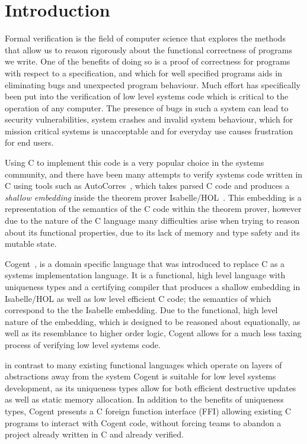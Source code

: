 \chapter{Introduction}\label{ch:intro}

Formal verification is the field of computer science that explores the methods that allow us to
  reason rigorously about the functional correctness of programs we write.
One of the benefits of doing so is a proof of correctness for programs with respect to a specification,
  and which for well specified programs aids in eliminating bugs and unexpected program behaviour.
Much effort has specifically been put into the verification of low level systems code
  which is critical to the operation of any computer.
The presence of bugs in such a system can lead to security vulnerabilities,
  system crashes and invalid system behaviour, which for mission critical systems is unacceptable and
  for everyday use causes frustration for end users.

Using C to implement this code is a very popular choice in the systems community,
  and there have been many attempts to verify systems code written in C using tools such as 
  AutoCorres~\citep{AutoCorres}, which takes parsed C code and produces a \textit{shallow embedding}
  inside the theorem prover Isabelle/HOL~\citep{IsabelleTutorial}.
This embedding is a representation of the semantics of the C code within the theorem prover,
  however due to the nature of the C language many difficulties arise when trying to
  reason about its functional properties, due to its lack of memory and type safety 
  and its mutable state.

Cogent~\citep{ICFPCogent}, is a domain specific language that was introduced to replace C as a systems
  implementation language.
It is a functional, high level language with uniqueness types and a certifying compiler
  that produces a shallow embedding in Isabelle/HOL as well as low level efficient C code;
  the semantics of which correspond to the the Isabelle embedding.
Due to the functional, high level nature of the embedding,
  which is designed to be reasoned about equationally, as well as its resemblance to higher order logic,
  Cogent allows for a much less taxing process of verifying low level systems code.

in contrast to many existing functional languages which operate
  on layers of abstractions away from the system Cogent is suitable for low level systems development,
  as its uniqueness types allow for both efficient destructive updates as well as static memory allocation.
In addition to the benefits of uniqueness types, Cogent presents a C foreign function interface (FFI) allowing existing C programs
 to interact with Cogent code, without forcing teams to abandon a project already written in C and already verified.

